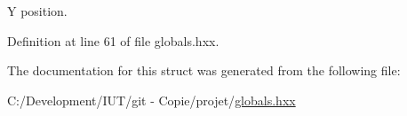 Y position. 



Definition at line 61 of file globals.\-hxx.



The documentation for this struct was generated from the following file\-:\begin{DoxyCompactItemize}
\item 
C\-:/\-Development/\-I\-U\-T/git -\/ Copie/projet/\hyperlink{globals_8hxx}{globals.\-hxx}\end{DoxyCompactItemize}
